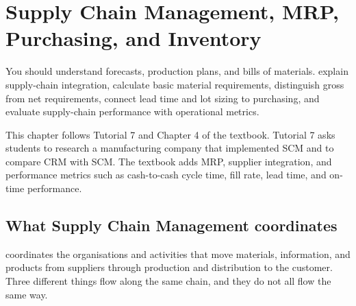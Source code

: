 \chapter{Supply Chain Management, MRP, Purchasing, and Inventory}
\label{ch:scm}

\chapterguide
  {You should understand forecasts, production plans, and bills of materials.}
  {explain supply-chain integration, calculate basic material requirements, distinguish gross from net requirements, connect lead time and lot sizing to purchasing, and evaluate supply-chain performance with operational metrics.}

\begin{sourcebasis}
This chapter follows Tutorial 7 and Chapter 4 of the textbook. Tutorial 7 asks
students to research a manufacturing company that implemented SCM and to compare
CRM with SCM. The textbook adds MRP, supplier integration, and performance
metrics such as cash-to-cash cycle time, fill rate, lead time, and on-time
performance.
\end{sourcebasis}

\section{What Supply Chain Management coordinates}

 coordinates the organisations and activities
that move materials, information, and products from suppliers through production
and distribution to the customer. Three different things flow along the same
chain, and they do not all flow the same way.

